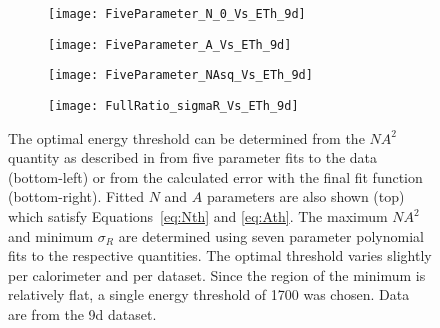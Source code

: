 \begin{figure}
\centering
    \begin{subfigure}[t]{0.45\textwidth}
        \centering
        \texttt{[image: FiveParameter\_N\_0\_Vs\_ETh\_9d]}
    \end{subfigure}
     \begin{subfigure}[t]{0.45\textwidth}
        \centering
        \texttt{[image: FiveParameter\_A\_Vs\_ETh\_9d]}
    \end{subfigure}
       
    \begin{subfigure}[t]{0.45\textwidth}
        \centering
        \texttt{[image: FiveParameter\_NAsq\_Vs\_ETh\_9d]}
    \end{subfigure}
    \begin{subfigure}[t]{0.45\textwidth}
        \centering
        \texttt{[image: FullRatio\_sigmaR\_Vs\_ETh\_9d]}
    \end{subfigure}%
\caption[Determination of optimal energy threshold]{The optimal energy threshold can be determined from the $NA^{2}$ quantity as described in  from five parameter fits to the data (bottom-left) or from the calculated error with the final fit function (bottom-right). Fitted $N$ and $A$ parameters are also shown (top) which satisfy Equations~\ref{eq:Nth} and \ref{eq:Ath}. The maximum $NA^{2}$ and minimum $\sigma_{R}$ are determined using seven parameter polynomial fits to the respective quantities. The optimal threshold varies slightly per calorimeter and per dataset. Since the region of the minimum is relatively flat, a single energy threshold of 1700 \MeV was chosen. Data are from the 9d dataset.}
\label{fig:OptimalEnergyThreshold}
\end{figure}



